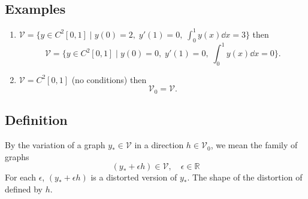 \documentclass[12pt,twoside]{article}
\begin{document}
\subsection{Examples}
\begin{enumerate}
\item $\mathcal{V}=\{y\in C^2[0,1]\;|\;y(0)=2,\; y'(1)=0,\; \int_0^1 y(x)\dd{x}=3\}$
  then
  \begin{equation*}
    \mathcal{V} = \{y\in C^2[0,1]\;|\;y(0)=0,\; y'(1)=0,\;\int_0^1y(x)\dd{x}=0\}.
  \end{equation*}
\item $\mathcal{V}=C^2[0,1]$ (no conditions)
  then $$\mathcal{V}_0=\mathcal{V}.$$
\end{enumerate}

\subsection{Definition}
By the variation of a graph $y_*\in\mathcal{V}$ in a direction
$h\in\mathcal{V}_0$, we mean the family of graphs
$$(y_*+\epsilon h)\in\mathcal{V},\quad \epsilon\in\mathbb{R}$$
For each $\epsilon$, $(y_*+\epsilon h)$ is a distorted version of $y_*$. The
shape of the distortion of defined by $h$.
\end{document}

